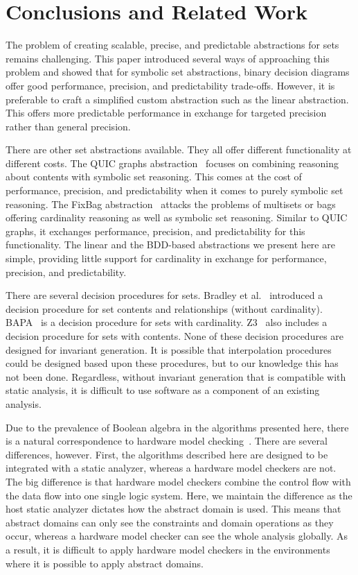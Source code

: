 \section{Conclusions and Related Work}
The problem of creating scalable, precise, and predictable abstractions for sets remains challenging.  This paper introduced several ways of approaching this problem and showed that for symbolic set abstractions, binary decision diagrams offer good performance, precision, and predictability trade-offs.  However, it is preferable to craft a simplified custom abstraction such as the linear abstraction.  This offers more predictable performance in exchange for targeted precision rather than general precision.

There are other set abstractions available.  They all offer different functionality at different costs.  The QUIC graphs abstraction~\cite{ab:ecoop:13,quicr:cav:14} focuses on combining reasoning about contents with symbolic set reasoning.  This comes at the cost of performance, precision, and predictability when it comes to purely symbolic set reasoning.  The FixBag abstraction~\cite{fixbag:cav:11} attacks the problems of multisets or bags offering cardinality reasoning as well as symbolic set reasoning.  Similar to QUIC graphs, it exchanges performance, precision, and predictability for this functionality.  The linear and the BDD-based abstractions we present here are simple, providing little support for cardinality in exchange for performance, precision, and predictability.

There are several decision procedures for sets.  Bradley et al.~\cite{bradley:vmcai:06} introduced a decision procedure for set contents and relationships (without cardinality).  BAPA~\cite{knr:jar:06,jahob:thesis:07} is a decision procedure for sets with cardinality.  Z3~\cite{mb:tacas:08} also includes a decision procedure for sets with contents.  None of these decision procedures are designed for invariant generation.  It is possible that interpolation procedures~\cite{interp:cav:03} could be designed based upon these procedures, but to our knowledge this has not been done.  Regardless, without invariant generation that is compatible with static analysis, it is difficult to use software as a component of an existing analysis.

Due to the prevalence of Boolean algebra in the algorithms presented here, there is a natural correspondence to hardware model checking~\cite{mc:toplas:86}.  There are several differences, however.  First, the algorithms described here are designed to be integrated with a static analyzer, whereas a hardware model checkers are not.  The big difference is that hardware model checkers combine the control flow with the data flow into one single logic system.  Here, we maintain the difference as the host static analyzer dictates how the abstract domain is used.  This means that abstract domains can only see the constraints and domain operations as they occur, whereas a hardware model checker can see the whole analysis globally.  As a result, it is difficult to apply hardware model checkers in the environments where it is possible to apply abstract domains.

